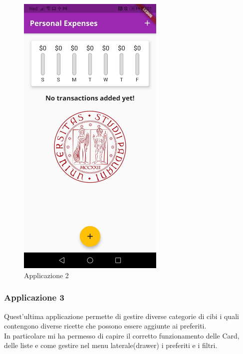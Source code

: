 \begin{figure}[htbp]	
	\centering
	\includegraphics[width=7cm]{immagini/app2.jpeg}
	\caption{Applicazione 2}
	\label{fig:Applicazione 2}
\end{figure}

\newpage

\subsubsection{Applicazione 3}
Quest'ultima applicazione permette di gestire diverse categorie di cibi i quali contengono diverse ricette che possono essere aggiunte ai preferiti.\\
In particolare mi ha permesso di capire il corretto funzionamento delle Card, delle liste e come gestire nel menu laterale(drawer) i preferiti e i filtri.\\

